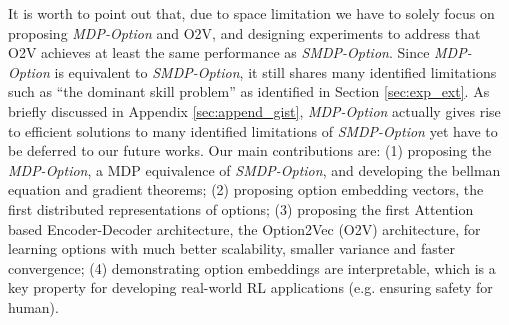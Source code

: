 \documentclass[10pt,journal,compsoc]{IEEEtran}
\renewcommand{\cite}{\citep}
\begin{document}
It is worth to point out that, due to space limitation we have to
solely focus on proposing \emph{MDP-Option} and O2V, and
designing experiments to address that O2V achieves at least the
same performance as \emph{SMDP-Option}. Since \emph{MDP-Option}
is equivalent to \emph{SMDP-Option}, it still shares many
identified limitations such as ``the dominant skill problem''
\cite{vezhnevets2017feudal,zhang2019dac} as identified in Section
\ref{sec:exp_ext}. As briefly discussed in Appendix
\ref{sec:append_gist}, \emph{MDP-Option} actually gives rise to
efficient solutions to many identified limitations of
\emph{SMDP-Option} yet have to be deferred to our future works.
Our main contributions are: (1) proposing the \emph{MDP-Option},
a MDP equivalence of \emph{SMDP-Option}, and developing the
bellman equation and gradient theorems; (2) proposing option
embedding vectors, the first distributed representations of
options; (3) proposing the first Attention
\cite{vaswani2017attention} based Encoder-Decoder architecture,
the Option2Vec (O2V) architecture, for learning options with much
better scalability, smaller variance and faster convergence; (4)
demonstrating option embeddings are interpretable, which is a key
property for developing real-world RL applications (e.g. ensuring
safety for human).





\end{document}
